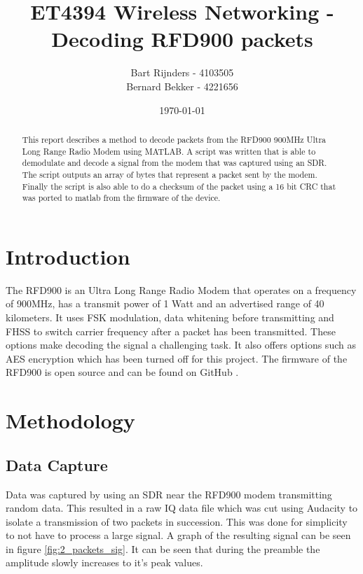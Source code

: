\documentclass{IEEEtran}
\title{ET4394 Wireless Networking - Decoding RFD900 packets}
\date{\today}
\author{
Bart Rijnders - 4103505 \\
Bernard Bekker - 4221656 
}
\begin{document}
\maketitle

\begin{abstract}

This report describes a method to decode packets from the RFD900 900MHz Ultra Long Range Radio Modem using MATLAB. A script was written that is able to demodulate and decode a signal from the modem that was captured using an SDR. The script outputs an array of bytes that represent a packet sent by the modem. Finally the script is also able to do a checksum of the packet using a 16 bit CRC that was ported to matlab from the firmware of the device.

\end{abstract}

\section{Introduction}

The RFD900 is an Ultra Long Range Radio Modem that operates on a frequency of 900MHz, has a transmit power of 1 Watt and an advertised range of 40 kilometers. It uses FSK modulation, data whitening before transmitting and FHSS to switch carrier frequency after a packet has been transmitted. These options make decoding the signal a challenging task. It also offers options such as AES encryption which has been turned off for this project. The firmware of the RFD900 is open source and can be found on GitHub \cite{4509719}.

\section{Methodology}

\subsection{Data Capture}

Data was captured by using an SDR near the RFD900 modem transmitting random data. This resulted in a raw IQ data file which was cut using Audacity to isolate a transmission of two packets in succession. This was done for simplicity to not have to process a large signal. A graph of the resulting signal can be seen in figure \ref{fig:2_packets_sig}. It can be seen that during the preamble the amplitude slowly increases to it's peak values.
\end{document}

